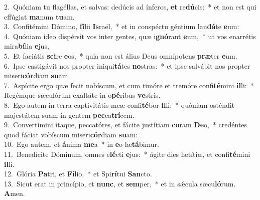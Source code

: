 {2.~}Quóniam tu flagéllas, et salvas: dedúcis ad ínferos, \textbf{et} re\textbf{dú}cis:~* et non est qui effúgiat \textbf{ma}num \textbf{tu}am.\\
{3.~}Confitémini Dómino, \textbf{fí}lii \textbf{Is}raël,~* et in conspéctu géntium lau\textbf{dá}te \textbf{e}um:\\
{4.~}Quóniam ídeo dispérsit vos inter gentes, quæ i\textbf{gnó}rant \textbf{e}um,~* ut vos enarrétis mira\textbf{bí}lia \textbf{e}jus,\\
{5.~}Et faciátis \textbf{sci}re \textbf{e}os,~* quia non est álius Deus omnípotens \textbf{præ}ter \textbf{e}um.\\
{6.~}Ipse castigávit nos propter iniqui\textbf{tá}tes \textbf{no}stras:~* et ipse salvábit nos propter miseri\textbf{cór}diam \textbf{su}am.\\
{7.~}Aspícite ergo quæ fecit nobíscum, et cum timóre et tremóre confi\textbf{té}mini \textbf{il}li:~* Regémque sæculórum exaltáte in o\textbf{pé}ribus \textbf{ve}stris.\\
{8.~}Ego autem in terra captivitátis meæ confi\textbf{té}bor \textbf{il}li:~* quóniam osténdit majestátem suam in gentem \textbf{pec}ca\textbf{trí}cem.\\
{9.~}Convertímini ítaque, peccatóres, et fácite justítiam \textbf{co}ram \textbf{De}o,~* credéntes quod fáciat vobíscum miseri\textbf{cór}diam \textbf{su}am:\\
{10.~}Ego autem, et \textbf{á}nima \textbf{me}a~* in \textbf{e}o læ\textbf{tá}bimur.\\
{11.~}Benedícite Dóminum, omnes e\textbf{lé}cti \textbf{e}jus:~* ágite dies lætítiæ, et confi\textbf{té}mini \textbf{il}li.\\
{12.~}Glória \textbf{Pa}tri, et \textbf{Fí}lio,~* et Spi\textbf{rí}tui \textbf{San}cto.\\
{13.~}Sicut erat in princípio, et \textbf{nunc}, et \textbf{sem}per,~* et in sǽcula sæcu\textbf{ló}rum. \textbf{A}men.\\
